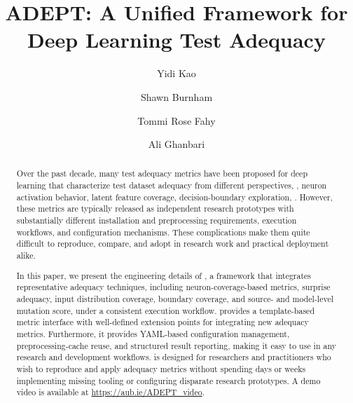 \documentclass[sigplan,screen]{acmart}
\begin{document}
\title{ADEPT: A Unified Framework for Deep Learning Test Adequacy}

\author{Yidi Kao}
\correspondingauthor
{}

\author{Shawn Burnham}

\author{Tommi Rose Fahy}

\author{Ali Ghanbari}

\begin{abstract}
Over the past decade, many test adequacy metrics have been proposed for deep learning that characterize test dataset adequacy from different perspectives, \eg, neuron activation behavior, latent feature coverage, decision-boundary exploration, \etc. 
However, these metrics are typically released as independent research prototypes with substantially different installation and preprocessing requirements, execution workflows, and configuration mechanisms. These complications make them quite difficult to reproduce, compare, and adopt in research work and practical deployment alike.

In this paper, we present the engineering details of \tool, a framework that integrates representative adequacy techniques, including neuron-coverage-based metrics, surprise adequacy, input distribution coverage, boundary coverage, and source- and model-level mutation score, under a consistent execution workflow. 
\tool provides a template-based metric interface with well-defined extension points for integrating new adequacy metrics.
Furthermore, it provides YAML-based configuration management, preprocessing-cache reuse, and structured result reporting, making it easy to use in any research and development workflows.
\tool is designed for researchers and practitioners who wish to reproduce and apply adequacy metrics without spending days or weeks implementing missing tooling or configuring disparate research prototypes.
A demo video is available at \url{https://aub.ie/ADEPT_video}.
\end{abstract}
\end{document}
